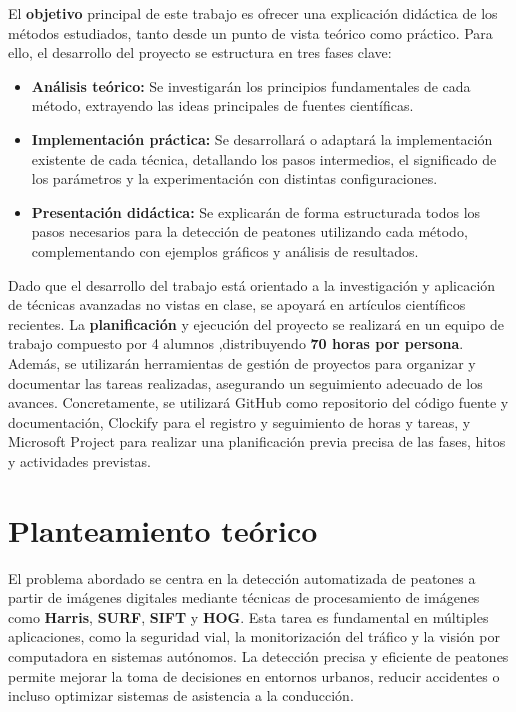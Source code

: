 \documentclass[a4paper]{article}
\begin{document}
 El \textbf{objetivo} principal de este trabajo es ofrecer una explicación didáctica de los métodos estudiados, tanto desde un punto de vista teórico como práctico. Para ello, el desarrollo del proyecto se estructura en tres fases clave:
 
 \begin{itemize}
     \item \textbf{Análisis teórico:} Se investigarán los principios fundamentales de cada método, extrayendo las ideas principales de fuentes científicas.
     \item \textbf{Implementación práctica:} Se desarrollará o adaptará la implementación existente de cada técnica, detallando los pasos intermedios, el significado de los parámetros y la experimentación con distintas configuraciones.
     \item \textbf{Presentación didáctica:} Se explicarán de forma estructurada todos los pasos necesarios para la detección de peatones utilizando cada método, complementando con ejemplos gráficos y análisis de resultados.
 \end{itemize}
 
 Dado que el desarrollo del trabajo está orientado a la investigación y aplicación de técnicas avanzadas no vistas en clase, se apoyará en artículos científicos recientes. La \textbf{planificación} y ejecución del proyecto se realizará en un equipo de trabajo compuesto por 4 alumnos
 ,distribuyendo \textbf{70 horas por persona}. Además, se utilizarán herramientas de gestión de proyectos para organizar y documentar las tareas realizadas, asegurando un seguimiento adecuado de los 
 avances. Concretamente, se utilizará GitHub como repositorio del código fuente y documentación, Clockify para el registro y seguimiento de horas y tareas, y Microsoft Project para realizar una planificación previa precisa de las fases, hitos y actividades previstas.
 \newpage

 \section{Planteamiento teórico}
 \par\vspace{0.5cm}

 El problema abordado se centra en la detección automatizada de peatones a partir de imágenes digitales mediante técnicas de procesamiento de imágenes como \textbf{Harris}, \textbf{SURF}, \textbf{SIFT} y \textbf{HOG}. Esta tarea es fundamental en múltiples aplicaciones, 
 como la seguridad vial, la monitorización del tráfico y la visión por computadora en sistemas autónomos. La detección 
 precisa y eficiente de peatones permite mejorar la toma de decisiones en entornos urbanos, reducir accidentes o incluso optimizar sistemas de asistencia a la conducción. 
 \par\vspace{0.5cm}
\end{document}
